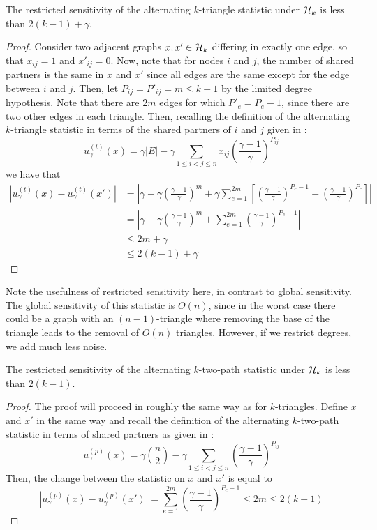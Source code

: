 \begin{claim}
The restricted sensitivity of the alternating $k$-triangle statistic under $\mathcal{H}_k$ is less than $2(k-1) + \gamma$.
\end{claim}
\begin{proof}
Consider two adjacent graphs $x, x'\in \mathcal{H}_k$ differing in exactly one edge, so that $x_{ij} = 1$ and $x'_{ij} = 0$. Now, note that for nodes $i$ and $j$, the number of shared partners is the same in $x$ and $x'$ since all edges are the same except for the edge between $i$ and $j$. Then, let $P_{ij} = P'_{ij} = m \leq k-1$ by the limited degree hypothesis. Note that there are $2m$ edges for which $P'_{e} = P_{e} - 1$, since there are two other edges in each triangle. Then, recalling the definition of the alternating $k$-triangle statistic in terms of the shared partners of $i$ and $j$ given in :
$$
u_\gamma^{(t)}(x) = \gamma |E| - \gamma \sum_{1 \leq i < j \leq n} x_{ij} \left(\frac{\gamma-1}{\gamma} \right)^{P_{ij}}
$$
we have that 
\begin{align*}
|u_\gamma^{(t)}(x) - u_\gamma^{(t)}(x')| &= \left|\gamma - \gamma \left(\frac{\gamma-1}{\gamma} \right)^{m}  + \gamma\sum_{e= 1}^{2m}  \left[\left(\frac{\gamma-1}{\gamma} \right)^{P_e-1}  - \left(\frac{\gamma-1}{\gamma} \right)^{P_e}\right]    \right|\\
& = \left|\gamma - \gamma \left(\frac{\gamma-1}{\gamma} \right)^{m}  + \sum_{e= 1}^{2m}  \left(\frac{\gamma-1}{\gamma} \right)^{P_e-1}   \right|\\
& \leq 2m + \gamma\\ 
& \leq 2(k-1) + \gamma 
\end{align*}
\end{proof}

Note the usefulness of restricted sensitivity here, in contrast to global sensitivity. The global sensitivity of this statistic is $O(n)$, since in the worst case there could be a graph with an $(n-1)$-triangle where removing the base of the triangle leads to the removal of $O(n)$ triangles. However, if we restrict degrees, we add much less noise.

\begin{claim}
The restricted sensitivity of the alternating $k$-two-path statistic under $\mathcal{H}_k$ is less than $2(k-1)$.
\end{claim}
\begin{proof}
The proof will proceed in roughly the same way as for $k$-triangles. Define $x$ and $x'$ in the same way and recall the definition of the alternating $k$-two-path statistic in terms of shared partners as given in :
$$
u_\gamma^{(p)}(x) = \gamma \binom{n}{2} - \gamma \sum_{1 \leq i < j \leq n} \left(\frac{\gamma-1}{\gamma} \right)^{P_{ij}}
$$
Then, the change between the statistic on $x$ and $x'$ is equal to 
$$|u_\gamma^{(p)}(x) -  u_\gamma^{(p)}(x')| = \sum_{e = 1}^{2m} \left( \frac{\gamma - 1}{\gamma} \right)^{P_e - 1} \leq 2m \leq 2(k-1)$$
\end{proof}

